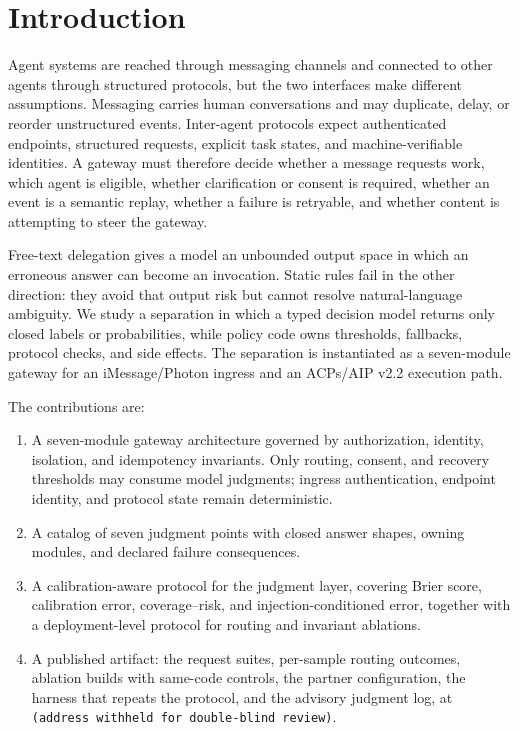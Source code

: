 \documentclass[runningheads,a4paper]{llncs}
\begin{document}
\section{Introduction}

Agent systems are reached through messaging channels and connected to other agents through structured protocols, but the two interfaces make different assumptions. Messaging carries human conversations and may duplicate, delay, or reorder unstructured events. Inter-agent protocols expect authenticated endpoints, structured requests, explicit task states, and machine-verifiable identities. A gateway must therefore decide whether a message requests work, which agent is eligible, whether clarification or consent is required, whether an event is a semantic replay, whether a failure is retryable, and whether content is attempting to steer the gateway.

Free-text delegation gives a model an unbounded output space in which an erroneous answer can become an invocation. Static rules fail in the other direction: they avoid that output risk but cannot resolve natural-language ambiguity. We study a separation in which a typed decision model returns only closed labels or probabilities, while policy code owns thresholds, fallbacks, protocol checks, and side effects. The separation is instantiated as a seven-module gateway for an iMessage/Photon ingress and an ACPs/AIP v2.2 execution path.

The contributions are:

\begin{enumerate}

\item A seven-module gateway architecture governed by authorization, identity, isolation, and idempotency invariants. Only routing, consent, and recovery thresholds may consume model judgments; ingress authentication, endpoint identity, and protocol state remain deterministic.

\item A catalog of seven judgment points with closed answer shapes, owning modules, and declared failure consequences.

\item A calibration-aware protocol for the judgment layer, covering Brier score, calibration error, coverage--risk, and injection-conditioned error, together with a deployment-level protocol for routing and invariant ablations.

\item A published artifact: the request suites, per-sample routing outcomes, ablation builds with same-code controls, the partner configuration, the harness that repeats the protocol, and the advisory judgment log, at \texttt{(address withheld for double-blind review)}.

\end{enumerate}
\end{document}
